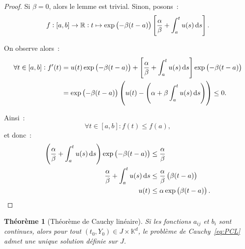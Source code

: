 \documentclass{report}
\newtheorem{thm}{Théorème}[chapter]
\theoremstyle{definition}
\theoremstyle{remark}
\numberwithin{equation}{section}
\newcommand{\K}{\mathbb K}
\newcommand{\R}{\mathbb R}
\begin{document}
			\begin{proof} Si $\beta = 0$, alors le lemme est trivial. Sinon, posons~:
			\begin{equation}
				f : [a, b] \to \R : t \mapsto \exp\left(-\beta(t-a)\right)\left[\frac \alpha\beta + \int_a^tu(s)\dif s\right].
			\end{equation}

			On observe alors~:
			\begin{align}
				\forall t \in [a, b] : f'(t) &= u(t)\exp\left(-\beta(t-a)\right) + \left[\frac \alpha\beta + \int_a^tu(s)\dif s\right]\exp\left(-\beta(t-a)\right) \\
				&= \exp\left(-\beta(t-a)\right)\left(u(t) - \left(\alpha + \beta\int_a^tu(s)\dif s\right)\right) \leq 0.
			\end{align}

			Ainsi~:
			\begin{equation}
				\forall t \in [a, b] : f(t) \leq f(a),
			\end{equation}
			et donc~:
			\begin{align}
				\left(\frac \alpha\beta + \int_a^tu(s)\dif s\right)\exp\left(-\beta(t-a)\right) &\leq \frac \alpha\beta \\
				\frac \alpha\beta + \int_a^tu(s)\dif s &\leq \frac \alpha\beta \left(\beta(t-a)\right) \\
				u(t) &\leq \alpha\exp\left(\beta(t-a)\right).
			\end{align}
			\end{proof}


			\begin{thm}[Théorème de Cauchy linéaire] Si les fonctions $a_{ij}$ et $b_i$ sont continues, alors pour tout $(t_0, Y_0) \in J \times \K^d$,
			le problème de Cauchy~\eqref{eq:PCL} admet une unique solution définie sur $J$.
			\end{thm}
\end{document}
